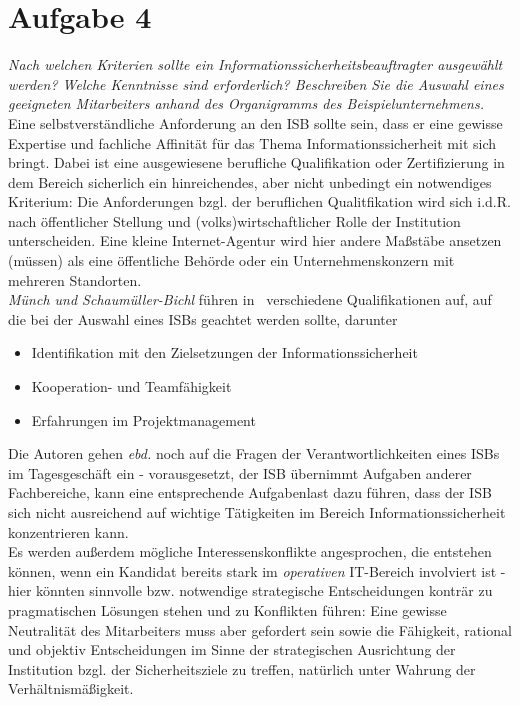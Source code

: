 \chapter{Aufgabe 4}

\textit{Nach welchen Kriterien sollte ein Informationssicherheitsbeauftragter ausgewählt
werden? Welche Kenntnisse sind erforderlich? Beschreiben Sie die Auswahl eines
geeigneten Mitarbeiters anhand des Organigramms des Beispielunternehmens.}\\

\noindent
Eine selbstverständliche Anforderung an den ISB sollte sein, dass er eine gewisse Expertise und fachliche Affinität für das Thema Informationssicherheit mit sich bringt.
Dabei ist eine ausgewiesene berufliche Qualifikation oder Zertifizierung in dem Bereich sicherlich ein hinreichendes, aber nicht unbedingt ein notwendiges Kriterium: Die Anforderungen {bzgl.} der beruflichen Qualitfikation wird sich i.d.R. nach öffentlicher Stellung und (volks)wirtschaftlicher Rolle der Institution unterscheiden.
Eine kleine Internet-Agentur wird hier andere Maßstäbe ansetzen (müssen) als eine öffentliche Behörde oder ein Unternehmenskonzern mit mehreren Standorten.\\

\noindent
\textit{Münch und Schaumüller-Bichl} führen in~\cite[43]{ITS2} verschiedene Qualifikationen auf, auf die bei der Auswahl eines ISBs geachtet werden sollte, darunter

\begin{itemize}
    \itemsep0.5em
    \item Identifikation mit den Zielsetzungen der Informationssicherheit
    \item Kooperation- und Teamfähigkeit
    \item Erfahrungen im Projektmanagement
\end{itemize}

Die Autoren gehen \textit{ebd.} noch auf die Fragen der Verantwortlichkeiten eines ISBs im Tagesgeschäft ein - vorausgesetzt, der ISB übernimmt Aufgaben anderer Fachbereiche, kann eine entsprechende Aufgabenlast dazu führen, dass der ISB sich nicht ausreichend auf wichtige Tätigkeiten im Bereich Informationssicherheit konzentrieren kann.\\
Es werden außerdem mögliche Interessenskonflikte angesprochen, die entstehen können, wenn ein Kandidat bereits stark im \textit{operativen} IT-Bereich involviert ist - hier könnten sinnvolle bzw. notwendige strategische Entscheidungen konträr zu pragmatischen Lösungen stehen und zu Konflikten führen: Eine gewisse Neutralität des Mitarbeiters muss aber gefordert sein sowie die Fähigkeit, rational und objektiv Entscheidungen im Sinne der strategischen Ausrichtung der Institution bzgl. der Sicherheitsziele zu treffen, natürlich unter Wahrung der Verhältnismäßigkeit.\\

